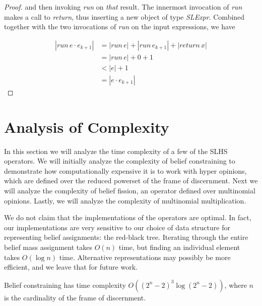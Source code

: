 \documentclass[thesis.tex]{subfiles}
\begin{document}
\begin{proof}
  and then invoking \emph{run} on \emph{that} result. The innermost invocation of \emph{run} makes a call
  to \emph{return}, thus inserting a new object of type \emph{SLExpr}. Combined together with the two
  invocations of \emph{run} on the input expressions, we have

  \begin{equation*}
  \begin{split}
    |run\,e \cdot e_{k + 1}|& = |run\,e| + |run\,e_{k+1}| + |return\,x| \\
                     & = |run\,e| + 0 + 1 \\
                     & < |e| + 1 \\
                     & = |e \cdot e_{k+1}|
  \end{split}
  \end{equation*}

\end{proof}






\section{Analysis of Complexity}

In this section we will analyze the time complexity of a few of the SLHS operators. We will initially
analyze the complexity of belief constraining to demonstrate how computationally expensive it is to
work with hyper opinions, which are defined over the reduced powerset of the frame of discernment.
Next we will analyze the complexity of belief fission, an operator defined over multinomial opinions.
Lastly, we will analyze the complexity of multinomial multiplication.

We do not claim that the implementations of the operators are optimal. In fact, our implementations
are very sensitive to our choice of data structure for representing belief assignments: the red-black
tree. Iterating through the entire belief mass assignment takes $O (n)$ time, but finding an individual
element takes $O (\log n)$ time. Alternative representations may possibly be more efficient, and we leave
that for future work.


\begin{theorem}
  Belief constraining has time complexity $O ((2^n - 2)^3 \log (2^n - 2))$,
  where $n$ is the cardinality of the frame of discernment.
\end{theorem}
\end{document}
